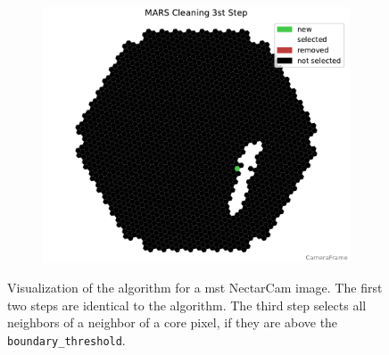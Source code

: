 \begin{figure}
\begin{subfigure}[t]{0.32\textwidth}
    \end{subfigure}
    \hfill
    \begin{subfigure}[t]{0.32\textwidth}
        \includegraphics[width=\textwidth]{plots/cleaner_steps/mars_3.pdf}
    \end{subfigure}
    \caption{Visualization of the \mars{} algorithm for a \gls{mst} NectarCam image. The first two
    steps are identical to the \tailcuts{} algorithm. The third step selects all neighbors of a neighbor of a
    core pixel, if they are above the \texttt{boundary\_threshold}.}
    \label{fig:mars_cleaning}
\end{figure}

